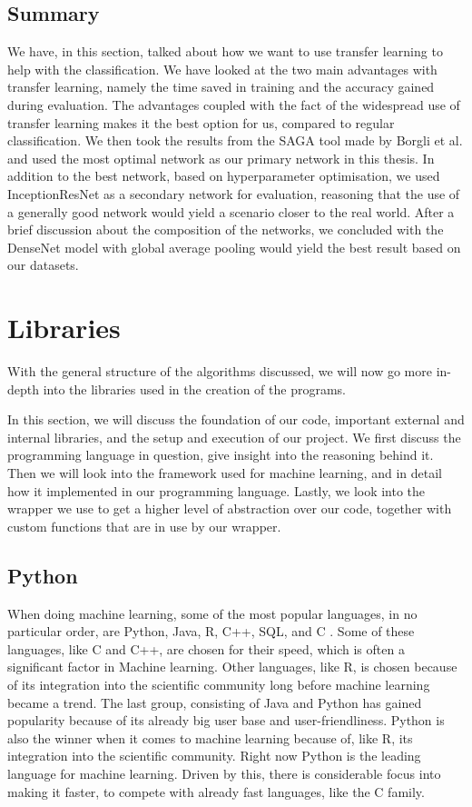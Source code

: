 \subsection{Summary}
We have, in this section, talked about how we want to use transfer learning to help with the classification. We have looked at the two main advantages with transfer learning, namely the time saved in training and the accuracy gained during evaluation. The advantages coupled with the fact of the widespread use of transfer learning makes it the best option for us, compared to regular classification.
 We then took the results from the SAGA tool made by Borgli et al. and used the most optimal network as our primary network in this thesis. 
In addition to the best network, based on hyperparameter optimisation, we used InceptionResNet as a secondary network for evaluation, reasoning that the use of a generally good network would yield a scenario closer to the real world.
After a brief discussion about the composition of the networks, we concluded with the DenseNet model with global average pooling would yield the best result based on our datasets.





\section{Libraries} 
With the general structure of the algorithms discussed, we will now go more in-depth into the libraries used in the creation of the programs.

In this section, we will discuss the foundation of our code, important external and internal libraries, and the setup and execution of our project.  
We first discuss the programming language in question, give insight into the reasoning behind it. Then we will look into the framework used for machine learning, and in detail how it implemented in our programming language. Lastly, we look into the wrapper we use to get a higher level of abstraction over our code, together with custom functions that are in use by our wrapper. 

\subsection{Python}
When doing machine learning, some of the most popular languages, in no particular order, are Python, Java, R, C++, SQL, and C \cite{kaggle}. Some of these languages, like C and C++, are chosen for their speed, which is often a significant factor in Machine learning. Other languages, like R, is chosen because of its integration into the scientific community long before machine learning became a trend. The last group, consisting of Java and Python has gained popularity because of its already big user base and user-friendliness. Python is also the winner when it comes to machine learning because of, like R, its integration into the scientific community. 
Right now Python is the leading language for machine learning. Driven by this, there is considerable focus into making it faster, to compete with already fast languages, like the C family. 

